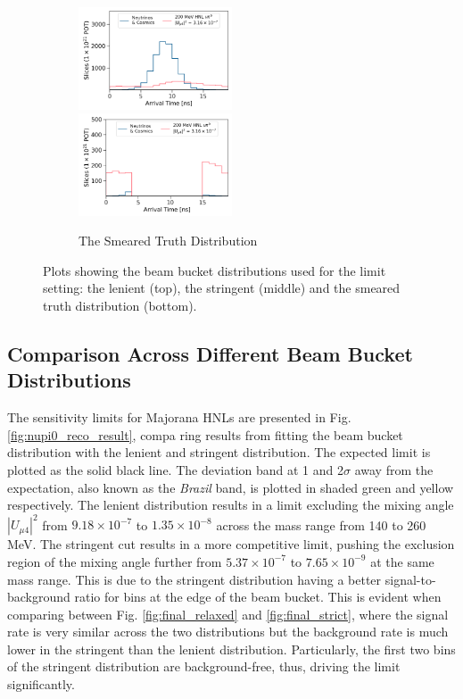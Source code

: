 \begin{figure}[htbp!]
\begin{subfigure}[b]{1.0\textwidth}
       	    \vspace{0.5cm}
        \end{subfigure}
        \begin{subfigure}[b]{1.0\textwidth}
            \includegraphics[width=0.5\textwidth]{smeared_truth}
            \includegraphics[width=0.5\textwidth]{smeared_truth_edge}
            \caption{The Smeared Truth Distribution}%
	    \label{fig:final_truth}
     	    \vspace{0.5cm}
        \end{subfigure}
        \caption{
	Plots showing the beam bucket distributions used for the limit setting: the lenient (top), the stringent (middle) and the smeared truth distribution (bottom).
	}
\end{figure}

\subsection{Comparison Across Different Beam Bucket Distributions}

The sensitivity limits for Majorana HNLs are presented in Fig. \ref{fig:nupi0_reco_result}, compa
ring results from fitting the beam bucket distribution with the lenient and stringent distribution.
The expected limit is plotted as the solid black line.
The deviation band at 1 and 2$\sigma$ away from the expectation, also known as the \textit{Brazil} band, is plotted in shaded green and yellow respectively.
The lenient distribution results in a limit excluding the mixing angle $|U_{\mu4}|^2$ from $9.18 \times 10^{-7}$ to $1.35 \times 10^{-8}$ across the mass range from 140 to 260 MeV.
The stringent cut results in a more competitive limit, pushing the exclusion region of the mixing angle further from $5.37 \times 10^{-7}$ to $7.65 \times 10^{-9}$ at the same mass range.
This is due to the stringent distribution having a better signal-to-background ratio for bins at the edge of the beam bucket.
This is evident when comparing between Fig. \ref{fig:final_relaxed} and \ref{fig:final_strict}, where the signal rate is very similar across the two distributions but the background rate is much lower in the stringent than the lenient distribution.
Particularly, the first two bins of the stringent distribution are background-free, thus, driving the limit significantly.

